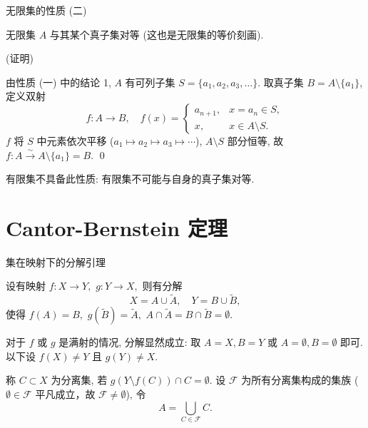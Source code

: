 \begin{frame}{无限集的性质 (二)}

\begin{thm}
无限集 $A$ 与其某个\alert{真子集}对等 (这也是无限集的等价刻画).
\end{thm}

\pause
\vspace{0.3em}

\startproof[bg=yellow, fg=red](证明)
\vspace{0.3em}

由性质 (一) 中的结论 1, $A$ 有可列子集 $S = \{a_1, a_2, a_3, \ldots\}$. 取真子集 $B = A \setminus \{a_1\}$, 定义双射
\[
f: A \to B, \quad f(x) = \begin{cases} a_{n+1}, & x = a_n \in S, \\ x, & x \in A \setminus S. \end{cases}
\]
$f$ 将 $S$ 中元素依次平移 ($a_1 \mapsto a_2 \mapsto a_3 \mapsto \cdots$), $A \setminus S$ 部分恒等, 故 $f: A \xrightarrow{\sim} A \setminus \{a_1\} = B$.
\qed

\pause
\vspace{0.3em}

\begin{remark}
有限集\alert{不具备}此性质: 有限集不可能与自身的真子集对等.
\end{remark}

\end{frame}


\section[Cantor-Bernstein 定理]{Cantor-Bernstein 定理}


\begin{frame}{集在映射下的分解引理}

\begin{lem}[集在映射下的分解引理]
设有映射 $f: X \to Y,$ $g: Y \to X,$ 则有分解
\[
X = A \cup \widetilde{A}, \quad Y = B \cup \widetilde{B},
\]
使得 $f(A) = B,$ $g(\widetilde{B}) = \widetilde{A},$ $A \cap \widetilde{A} = B \cap \widetilde{B} = \emptyset.$
\end{lem}

\pause
\vspace{0.3em}

\startproof[bg=yellow, fg=red]
\vspace{0.3em}

对于 $f$ 或 $g$ 是满射的情况, 分解显然成立: 取 $A = X, B = Y$ 或 $A = \emptyset, B = \emptyset$ 即可. 以下设 $f(X) \neq Y$ 且 $g(Y) \neq X$.

\pause
\vspace{0.5em}

{\color{red}} 称 $C \subset X$ 为\alert{分离集}, 若 $g(Y \setminus f(C)) \cap C = \emptyset$. 设 $\mathscr{F}$ 为所有分离集构成的集族 ($\emptyset \in \mathscr{F}$ 平凡成立，故 $\mathscr{F} \neq \emptyset$), 令
\[
A = \bigcup_{C \in \mathscr{F}} C.
\]

\end{frame}

